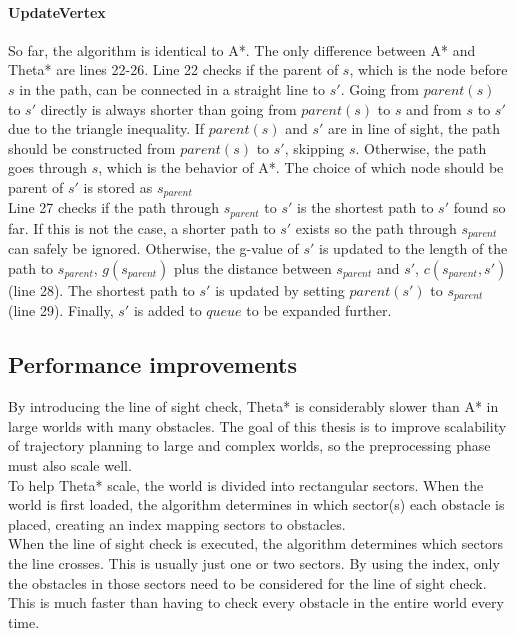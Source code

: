 \paragraph{UpdateVertex}
So far, the algorithm is identical to A*. The only difference between A* and Theta* are lines 22-26. Line 22 checks if the parent of $s$, which is the node before $s$ in the path, can be connected in a straight line to $s'$. Going from $parent(s)$ to $s'$ directly is always shorter than going from $parent(s)$ to $s$ and from $s$ to $s'$ due to the triangle inequality. If $parent(s)$ and $s'$ are in line of sight, the path should be constructed from $parent(s)$ to $s'$, skipping $s$. Otherwise, the path goes through $s$, which is the behavior  of A*. The choice of which node should be parent of $s'$ is stored as $s_{parent}$\\
Line 27 checks if the path through $s_{parent}$ to $s'$ is the shortest path to $s'$ found so far. If this is not the case, a shorter path to $s'$ exists so the  path through $s_{parent}$ can safely be ignored. Otherwise, the g-value of $s'$ is updated to the length of the path to $s_{parent}$, $g(s_{parent})$ plus the distance between $s_{parent}$ and $s'$, $c(s_{parent},s')$ (line 28). The shortest path to $s'$ is updated by setting $parent(s')$ to $s_{parent}$ (line 29). Finally, $s'$ is added to $queue$ to be expanded further.
\subsection{Performance improvements}
By introducing the line of sight check, Theta* is considerably slower than A* in large worlds with many obstacles. The goal of this thesis is to improve scalability of trajectory planning to large and complex worlds, so the preprocessing phase must also scale well. \\
To help Theta* scale, the world is divided into rectangular sectors. When the world is first loaded, the algorithm determines in which sector(s) each obstacle is placed, creating an index mapping sectors to obstacles. \\
When the line of sight check is executed, the algorithm determines which sectors the line crosses. This is usually just one or two sectors. By using the index, only the obstacles in those sectors need to be considered for the line of sight check. This is much faster than having to check every obstacle in the entire world every time.



